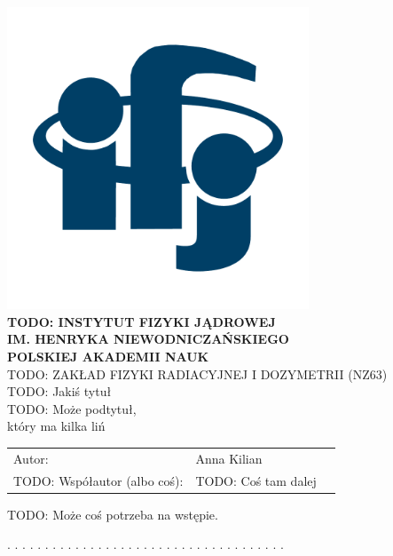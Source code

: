 
\begin{center}
\includegraphics[width=9cm]{obrazki/logo_ifj_kolor2.pdf}\\[9mm]
\textbf{TODO: INSTYTUT FIZYKI JĄDROWEJ \\
	IM. HENRYKA NIEWODNICZAŃSKIEGO \\
	POLSKIEJ AKADEMII NAUK}\\[5mm]
TODO: ZAKŁAD FIZYKI RADIACYJNEJ I DOZYMETRII (NZ63) \\[8mm]
\Large{TODO: Jakiś tytuł} \\[8mm]
\Large{TODO: Może podtytuł,\\
	który ma kilka liń}\\[8mm]
\end{center}


\begin{tabular}{lll}
	Autor: & Anna Kilian \\
	TODO: Współautor (albo coś): & TODO: Coś tam dalej
\end{tabular}

\czystastopka
{}

\pagebreak

TODO: Może coś potrzeba na wstępie.\\[1cm]

\begin{flushright}
. . . . . . . . . . . . . . . . . . . . . . . . . . . . . . . . . . . . .
\end{flushright}


\czystastopka

\pagebreak
